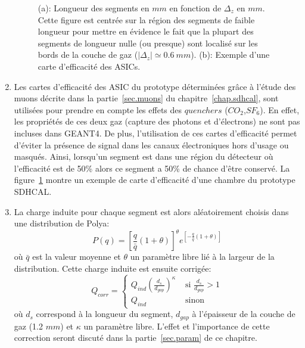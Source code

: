 \begin{enumerate}[~~1-]
\begin{figure}[!ht]
    \caption{(a): Longueur des segments en $mm$ en fonction de $\Delta_z$ en $mm$. Cette figure est centrée sur la région des segments de faible longueur pour mettre en évidence le fait que la plupart des segments de longueur nulle (ou presque) sont localisé sur les bords de la couche de gaz ($|\Delta_z|\simeq0.6\ mm$). (b): Exemple d'une carte d'efficacité des ASICs.}
    \label{fig.map_and_length_vs_deltaz}
  \end{figure}
\item Les cartes d'efficacité des ASIC du prototype déterminées grâce à l'étude des muons décrite dans la partie~\ref{sec.muons} du chapitre~\ref{chap.sdhcal}, sont utilisées pour prendre en compte les effets des $quenchers$ ($CO_2$,$SF_6$). En effet, les propriétés de ces deux gaz (capture des photons et d'électrons) ne sont pas incluses dans GEANT4. De plus, l'utilisation de ces cartes d’efficacité permet d'éviter la présence de signal dans les canaux électroniques hors d'usage ou masqués. Ainsi, lorsqu'un segment est dans une région du détecteur où l'efficacité est de 50\% alors ce segment a 50\% de chance d'être conservé. La figure~\ref{fig.map_and_length_vs_deltaz} montre un exemple de carte d'efficacité d'une chambre du prototype SDHCAL.
\item La charge induite pour chaque segment est alors aléatoirement choisis dans une distribution de Polya: 
  \begin{equation}
    \label{eq.polya}
    P(q)=[\frac{q}{\bar q}(1+\theta)]^{\theta}e^{[-\frac{q}{\bar q}(1+\theta)]}
  \end{equation}
  où $\bar q$ est la valeur moyenne et $\theta$ un paramètre libre lié à la largeur de la distribution. Cette charge induite est ensuite corrigée: 
  \begin{equation}
    \label{eq.lengthcorrection}
    Q_{corr} = \left\{ \begin{array}{rl}
      Q_{ind}(\frac{d_s}{d_{gap}})^\kappa &\mbox{ si $\frac{d_s}{d_{gap}}>1$} \\
      Q_{ind} &\mbox{ sinon}
    \end{array} \right.
  \end{equation}
  où $d_s$ correspond à la longueur du segment, $d_{gap}$ à l'épaisseur de la couche de gaz (1.2 $mm$) et $\kappa$ un paramètre libre. L'effet et l'importance de cette correction seront discuté dans la partie~\ref{sec.param} de ce chapitre.

\end{enumerate}
